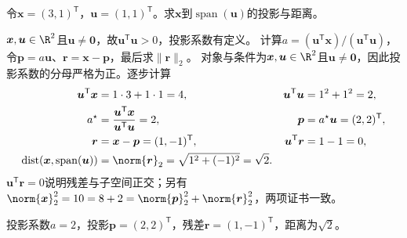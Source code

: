 \begin{example}[二维投影与残差]\label{exm:V1-C02-projection}\label{schema:V1-C02:CH-18}\label{schema:V1-C02:CH-32}
令$\boldsymbol{x}=(3,1)^{\mathsf T}$，$\boldsymbol{u}=(1,1)^{\mathsf T}$。求$\boldsymbol{x}$到$\operatorname{span}(\boldsymbol{u})$的投影与距离。
\end{example}
\label{schema:V1-C02:CH-33}
\begin{solution}
\SolGiven $\boldsymbol x,\boldsymbol u\in\R^2$且$\boldsymbol u\ne\boldsymbol0$，故$\boldsymbol u^{\mathsf T}\boldsymbol u>0$，投影系数有定义。
\SolPlan 计算$a=(\boldsymbol u^{\mathsf T}\boldsymbol x)/(\boldsymbol u^{\mathsf T}\boldsymbol u)$，令$\boldsymbol p=a\boldsymbol u$、$\boldsymbol r=\boldsymbol x-\boldsymbol p$，最后求$\|\boldsymbol r\|_2$。
\SolDerive
对象与条件为$\boldsymbol{x},\boldsymbol{u}\in\R^2$且$\boldsymbol{u}\ne\boldsymbol0$，因此投影系数的分母严格为正。逐步计算
\[
\begin{aligned}
\boldsymbol{u}^{\mathsf T}\boldsymbol{x}&=1\cdot3+1\cdot1=4,
&\boldsymbol{u}^{\mathsf T}\boldsymbol{u}&=1^2+1^2=2,\\
a^\star&=\frac{\boldsymbol{u}^{\mathsf T}\boldsymbol{x}}
{\boldsymbol{u}^{\mathsf T}\boldsymbol{u}}=2,
&\boldsymbol{p}&=a^\star\boldsymbol{u}=(2,2)^{\mathsf T},\\
\boldsymbol{r}&=\boldsymbol{x}-\boldsymbol{p}=(1,-1)^{\mathsf T},
&\boldsymbol{u}^{\mathsf T}\boldsymbol{r}&=1-1=0,\\
\operatorname{dist}(\boldsymbol{x},\operatorname{span}(\boldsymbol{u}))
&=\norm{\boldsymbol r}_2=\sqrt{1^2+(-1)^2}=\sqrt2.
\end{aligned}
\]
\SolCheck $\boldsymbol u^{\mathsf T}\boldsymbol r=0$说明残差与子空间正交；另有$\norm{\boldsymbol x}_2^2=10=8+2=\norm{\boldsymbol p}_2^2+\norm{\boldsymbol r}_2^2$，两项证书一致。

\SolAnswer 投影系数$a=2$，投影$\boldsymbol p=(2,2)^{\mathsf T}$，残差$\boldsymbol r=(1,-1)^{\mathsf T}$，距离为$\sqrt2$。
\end{solution}

